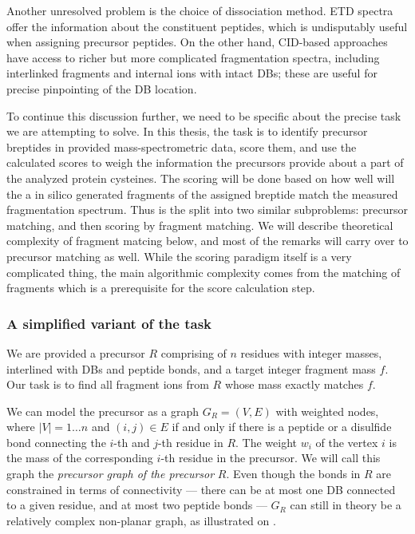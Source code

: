 Another unresolved problem is the choice of dissociation method. ETD spectra offer the information about the constituent peptides, which is undisputably useful when assigning precursor peptides. On the other hand, CID-based approaches have access to richer but more complicated fragmentation spectra, including interlinked fragments and internal ions with intact DBs; these are useful for precise pinpointing of the DB location.

To continue this discussion further, we need to be specific about the precise task we are attempting to solve. In this thesis, the task is to identify precursor breptides in provided mass-spectrometric data, score them, and use the calculated scores to weigh the information the precursors provide about a part of the analyzed protein cysteines. The scoring will be done based on how well will the a in silico generated fragments of the assigned breptide match the measured fragmentation spectrum. Thus is the split into two similar subproblems: precursor matching, and then scoring by fragment matching. We will describe theoretical complexity of fragment matcing below, and most of the remarks will carry over to precursor matching as well. While the scoring paradigm itself is a very complicated thing, the main algorithmic complexity comes from the matching of fragments which is a prerequisite for the score calculation step.

\subsubsection{A simplified variant of the task}

We are provided a precursor \(R\) comprising of \(n\) residues with integer masses, interlined with DBs and peptide bonds, and a target integer fragment mass \(f\). Our task is to find all fragment ions from \(R\) whose mass exactly matches \(f\).

We can model the precursor as a graph \(G_R = (V, E)\) with weighted nodes, where \(|V|  = 1\ldots n\) and \((i, j) \in E\) if and only if there is a peptide or a disulfide bond connecting  the \(i\)-th and \(j\)-th residue in \(R\). The weight \(w_i\) of the vertex \(i\) is the mass of the corresponding \(i\)-th residue in the precursor. We will call this graph the \emph{precursor graph of the precursor} \(R\). Even though the bonds in \(R\) are constrained in terms of connectivity --- there can be at most one DB connected to a given residue, and at most two peptide bonds --- \(G_R\) can still in theory be a relatively complex non-planar graph, as illustrated on .

